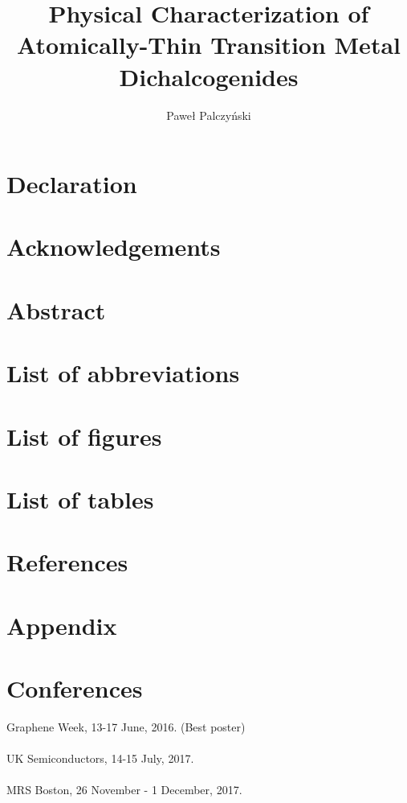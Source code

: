 \documentclass[12pt, a4paper]{report}
\author{Paweł Palczyński}
\begin{document}
\title{Physical Characterization of Atomically-Thin Transition Metal Dichalcogenides}

\tableofcontents

\maketitle

\section*{Declaration}
\section*{Acknowledgements}
\section*{Abstract}
\section*{List of abbreviations}
\section*{List of figures}
\section*{List of tables}

\newpage




	\label{sec:Introduction}










	
\section*{References}
\section*{Appendix}


\section*{Conferences}

Graphene Week, 13-17 June, 2016. (Best poster)\\ \\
UK Semiconductors, 14-15 July, 2017.\\ \\
MRS Boston, 26 November - 1 December, 2017.


{}
\end{document}
